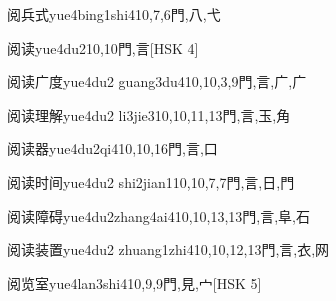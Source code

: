 \begin{EntryWithPhonetic}{阅兵式}{yue4bing1shi4}{10,7,6}{⾨,⼋,⼷}
\end{EntryWithPhonetic}

\begin{EntryWithPhonetic}{阅读}{yue4du2}{10,10}{⾨,⾔}[HSK 4]
\end{EntryWithPhonetic}

\begin{EntryWithPhonetic}{阅读广度}{yue4du2 guang3du4}{10,10,3,9}{⾨,⾔,⼴,⼴}
\end{EntryWithPhonetic}

\begin{EntryWithPhonetic}{阅读理解}{yue4du2 li3jie3}{10,10,11,13}{⾨,⾔,⽟,⾓}
\end{EntryWithPhonetic}

\begin{EntryWithPhonetic}{阅读器}{yue4du2qi4}{10,10,16}{⾨,⾔,⼝}
\end{EntryWithPhonetic}

\begin{EntryWithPhonetic}{阅读时间}{yue4du2 shi2jian1}{10,10,7,7}{⾨,⾔,⽇,⾨}
\end{EntryWithPhonetic}

\begin{EntryWithPhonetic}{阅读障碍}{yue4du2zhang4ai4}{10,10,13,13}{⾨,⾔,⾩,⽯}
\end{EntryWithPhonetic}

\begin{EntryWithPhonetic}{阅读装置}{yue4du2 zhuang1zhi4}{10,10,12,13}{⾨,⾔,⾐,⽹}
\end{EntryWithPhonetic}

\begin{EntryWithPhonetic}{阅览室}{yue4lan3shi4}{10,9,9}{⾨,⾒,⼧}[HSK 5]
\end{EntryWithPhonetic}

